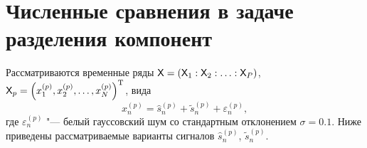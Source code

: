 \documentclass[specialist,
    substylefile=spbu.rtx,
    subf,href,colorlinks=true, 12pt]{disser}
\theoremstyle{plain}
\theoremstyle{definition}
\theoremstyle{remark}
\begin{document}


    \section{Численные сравнения в задаче разделения компонент}\label{sec:numerical-comp-sep}
    Рассматриваются временные ряды $\mathsf{X} = \left(\mathsf{X}_1: \mathsf{X}_2: \ldots: \mathsf{X}_P\right)$,
    $\mathsf{X}_p = \left(x_1^{(p)}, x_2^{(p)}, \ldots, x_N^{(p)}\right)^{\mathrm{T}}$, вида
    \begin{equation*}
        x_n^{(p)} = \hat{s}_n^{(p)} + \tilde{s}_n^{(p)} + \varepsilon_n^{(p)},
    \end{equation*}
    где $\varepsilon_n^{(p)}$ "--- белый гауссовский шум со стандартным отклонением $\sigma = 0.1$.
    Ниже приведены рассматриваемые варианты сигналов $\hat{s}_n^{(p)}$, $\tilde{s}_n^{(p)}$.
\end{document}
